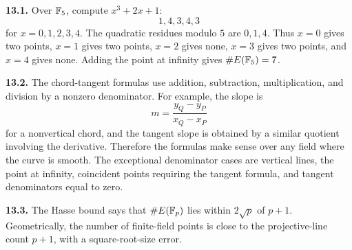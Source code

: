 \textbf{13.1.} Over \(\mathbb{F}_5\), compute \(x^3+2x+1\):
\[
  1,4,3,4,3
\]
for \(x=0,1,2,3,4\).  The quadratic residues modulo \(5\) are \(0,1,4\).
Thus \(x=0\) gives two points, \(x=1\) gives two points, \(x=2\) gives none,
\(x=3\) gives two points, and \(x=4\) gives none.  Adding the point at infinity
gives \(\#E(\mathbb{F}_5)=7\).

\begin{center}
\end{center}

\textbf{13.2.} The chord-tangent formulas use addition, subtraction,
multiplication, and division by a nonzero denominator.  For example, the slope is
\[
  m=\frac{y_Q-y_P}{x_Q-x_P}
\]
for a nonvertical chord, and the tangent slope is obtained by a similar quotient
involving the derivative.  Therefore the formulas make sense over any field
where the curve is smooth.  The exceptional denominator cases are vertical
lines, the point at infinity, coincident points requiring the tangent formula,
and tangent denominators equal to zero.

\begin{center}
\end{center}

\textbf{13.3.} The Hasse bound says that \(\#E(\mathbb{F}_p)\) lies within
\(2\sqrt p\) of \(p+1\).  Geometrically, the number of finite-field points is
close to the projective-line count \(p+1\), with a square-root-size error.


